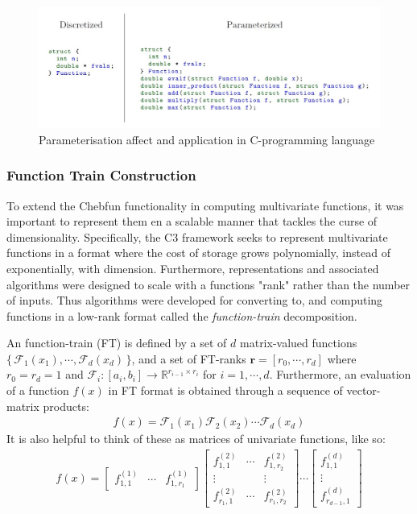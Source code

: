 \documentclass[11pt,draftd]{article}
\begin{document}
\begin{figure}[h!]
	\centering
	\includegraphics[scale = 0.4]{images/ContinuousLinearAlgebraDifference1}
	\caption{Parameterisation affect and application in C-programming language}
\end{figure}

\subsubsection{Function Train Construction}
To extend the Chebfun functionality in computing multivariate functions, it was important to represent them en a scalable manner that tackles the curse of dimensionality. Specifically, the C3 framework seeks to represent multivariate functions in a format where the cost of storage grows polynomially, instead of exponentially, with dimension. Furthermore, representations and associated algorithms were designed to scale with a functions "rank" rather than the number of inputs. Thus algorithms were developed for converting to, and computing functions in a low-rank format called the \textit{function-train} decomposition.

An function-train (FT) is defined by a set of $ d $ matrix-valued functions $ \{\, \mathcal{F}_{1}(x_{1}),\cdots,\mathcal{F}_{d}(x_{d}) \,\} $, and a set of FT-ranks $ \bm{r} = [r_{0},\cdots,r_{d}] $ where $ r_{0} = r_{d} = 1 $ and $ \mathcal{F}_{i} : [a_{i}, b_{i}] \rightarrow \mathbb{R}^{r_{i-1}\times r_{i}} $ for $ i = 1, \cdots, d $. Furthermore, an evaluation of a function $ f (x) $ in FT format is obtained through a sequence of vector-matrix products:
\begin{align*}
	f(x) = \mathcal{F}_{1}(x_{1})\mathcal{F}_{2}(x_{2}) \cdots \mathcal{F}_{d}(x_{d}) 
\end{align*}
It is also helpful to think of these as matrices of univariate functions, like so:
\begin{align}
	f(x) = \begin{bmatrix}
	f_{1,1}^{(1)} & \cdots & f_{1,r_{1}}^{(1)}
	\end{bmatrix}
	\begin{bmatrix}
	f_{1,1}^{(2)} & \cdots & f_{1,r_{2}}^{(2)} \\
	\vdots & & \vdots \\
	f_{r_{1},1}^{(2)} & \cdots & f_{r_{1},r_{2}}^{(2)}
	\end{bmatrix} 
	\cdots
	\begin{bmatrix}
	f_{1,1}^{(d)} \\
	\vdots \\
	f_{r_{d-1},1}^{(d)}
	\end{bmatrix}
\end{align}
\end{document}
